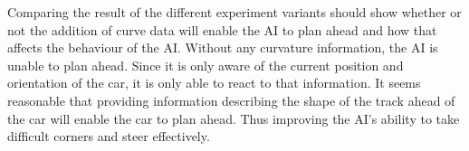 Comparing the result of the different experiment variants should show whether or not the addition of curve data will enable the AI to plan ahead and how that affects the behaviour of the AI. Without any curvature information, the AI is unable to plan ahead. Since it is only aware of the current position and orientation of the car, it is only able to react to that information. It seems reasonable that providing information describing the shape of the track ahead of the car will enable the car to plan ahead. Thus improving the AI's ability to take difficult corners and steer effectively. 





